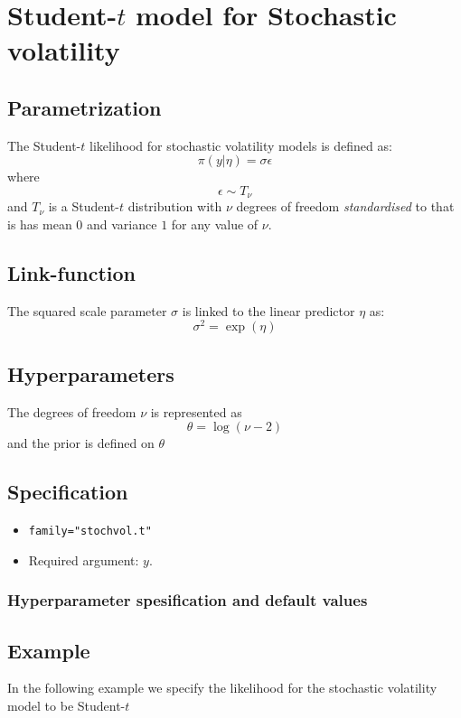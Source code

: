 \documentclass[a4paper,11pt]{article}
\begin{document}
\section*{Student-$t$ model for Stochastic volatility}

\subsection*{Parametrization}

The Student-$t$ likelihood for stochastic volatility models is defined as:
\[
\pi(y |\eta )=\sigma \epsilon 
\]
where
\[
\epsilon \sim T_{\nu}
\]
and $T_{\nu}$ is a Student-$t$ distribution with $\nu$ degrees of freedom {\it standardised} to that is has mean $0$ and variance $1$ for any value of $\nu$.

\subsection*{Link-function}

The squared scale parameter $\sigma$ is linked to the linear predictor $\eta $ as:
\[
\sigma^{2} =\exp(\eta)
\]

\subsection*{Hyperparameters}

The degrees of freedom $\nu$ is represented as
\[
\theta=\log(\nu-2)
\]
and the prior is defined on $\theta$

\subsection*{Specification}

\begin{itemize}
\item \texttt{family="stochvol.t"}
\item Required argument: $y$.
\end{itemize}

\subsubsection*{Hyperparameter spesification and default values}


\subsection*{Example}
In the following example we specify the likelihood for the stochastic
volatility model to be Student-$t$
 
\end{document}
